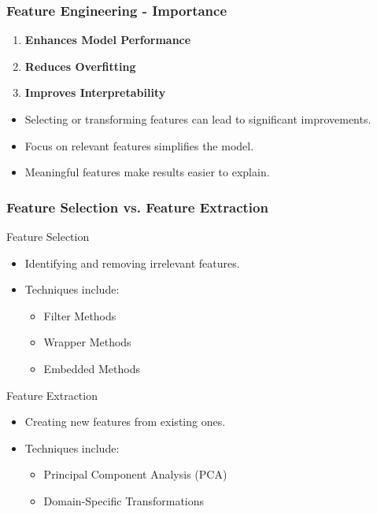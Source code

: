 \documentclass[aspectratio=169]{beamer}
\begin{document}
\begin{frame}[fragile]
    \frametitle{Feature Engineering - Importance}
    \begin{enumerate}
        \item \textbf{Enhances Model Performance}
        \item \textbf{Reduces Overfitting}
        \item \textbf{Improves Interpretability}
    \end{enumerate}
    \begin{itemize}
        \item Selecting or transforming features can lead to significant improvements.
        \item Focus on relevant features simplifies the model.
        \item Meaningful features make results easier to explain.
    \end{itemize}
\end{frame}

\begin{frame}[fragile]
    \frametitle{Feature Selection vs. Feature Extraction}
    \begin{block}{Feature Selection}
        \begin{itemize}
            \item Identifying and removing irrelevant features.
            \item Techniques include:
            \begin{itemize}
                \item Filter Methods
                \item Wrapper Methods
                \item Embedded Methods
            \end{itemize}
        \end{itemize}
    \end{block}
    \begin{block}{Feature Extraction}
        \begin{itemize}
            \item Creating new features from existing ones.
            \item Techniques include:
            \begin{itemize}
                \item Principal Component Analysis (PCA)
                \item Domain-Specific Transformations
            \end{itemize}
        \end{itemize}
    \end{block}
\end{frame}
\end{document}
